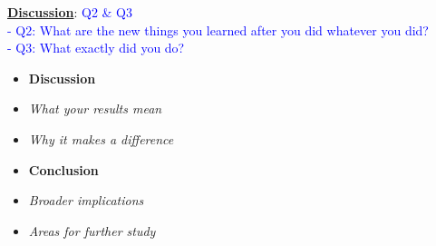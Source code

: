 \noindent\uline{\textbf{Discussion}}: 
\textcolor{blue}{Q2 \& Q3\\
- Q2: What are the new things you learned after you did whatever you did?\\
- Q3: What exactly did you do?}\\

\begin{itemize}
\color{red}
\item \textbf{Discussion}
\item \textit{What your results mean}
\item \textit{Why it makes a difference}
\item \textbf{Conclusion}
\item \textit{Broader implications}
\item \textit{Areas for further study}
\end{itemize}





